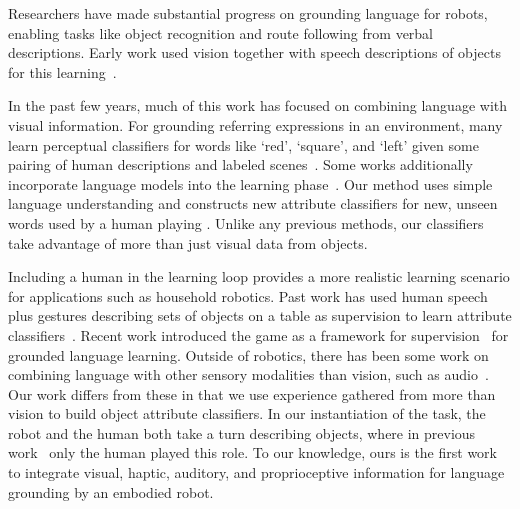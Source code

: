 Researchers have made substantial progress on grounding language for robots, enabling tasks like object recognition and route following from verbal descriptions. 
Early work used vision together with speech descriptions of objects for this learning~\cite{roy:cogsci02}.

In the past few years, much of this work has focused on combining language with visual information. 
For grounding referring expressions in an environment, many learn perceptual classifiers for words like `red', `square', and `left' given some pairing of human descriptions and labeled scenes~\cite{liu:acl14,malinowski:nips14,mohan:acs13,sun:icra13,dindo:iros10,vogel:aaai10}. 
Some works additionally incorporate language models into the learning phase~\cite{spranger:ijcai15,krishnamurthy:acl13,perera:aaai13,matuszek:icml12}. 
Our method uses simple language understanding and constructs new attribute classifiers for new, unseen words used by a human playing \ispy. 
Unlike any previous methods, our classifiers take advantage of more than just visual data from objects.

Including a human in the learning loop provides a more realistic learning scenario for applications such as household robotics. 
Past work has used human speech plus gestures describing sets of objects on a table as supervision to learn attribute classifiers~\cite{matuszek:aaai14,kollar:rss13}. 
Recent work introduced the \ispy game as a framework for supervision~\cite{parde:ijcai15} for grounded language learning. 
Outside of robotics, there has been some work on combining language with other sensory modalities than vision, such as audio~\cite{kiela:emnlp15}. 
Our work differs from these in that we use experience gathered from more than vision to build object attribute classifiers. 
In our instantiation of the \ispy task, the robot and the human both take a turn describing objects, where in previous work~ only the human played this role. 
To our knowledge, ours is the first work to integrate visual, haptic, auditory, and proprioceptive information for language grounding by an embodied robot.

